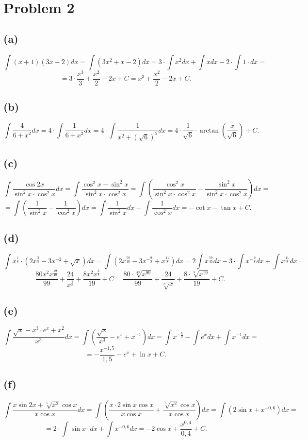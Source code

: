 \documentclass{article}
\begin{document}
\section*{Problem 2}
\subsection*{(a)}
$$\int(x + 1)(3x - 2)dx = \int(3x^2 + x - 2)dx = 3\cdot\int x^2dx + \int xdx - 2\cdot\int1\cdot dx = $$
$$ = 3\cdot\frac{x^3}{3} + \frac{x^2}{2} - 2x + C = x^3 + \frac{x^2}{2} - 2x + C.$$
\subsection*{(b)}
$$\int\frac{4}{6 + x^2}dx = 4\cdot\int\frac{1}{6 + x^2}dx = 4\cdot\int\frac{1}{x^2 + (\sqrt{6})^2}dx = 4\cdot\frac{1}{\sqrt{6}}\cdot\arctan{(\frac{x}{\sqrt{6}})} + C.$$
\subsection*{(c)}
$$\int\frac{\cos{2x}}{\sin^2{x}\cdot\cos^2{x}}dx = \int\frac{\cos^2{x} - \sin^2{x}}{\sin^2{x}\cdot\cos^2{x}} = \int\left(\frac{\cos^2{x}}{\sin^2{x}\cdot\cos^2{x}} - \frac{\sin^2{x}}{\sin^2{x}\cdot\cos^2{x}}\right)dx = $$
$$= \int\left(\frac{1}{\sin^2{x}} - \frac{1}{\cos^2{x}}\right)dx = \int\frac{1}{\sin^2{x}}dx - \int\frac{1}{\cos^2{x}}dx = - \cot{x} - \tan{x} + C.$$
\subsection*{(d)}
$$\int x^{\frac{7}{8}}\cdot(2x^{\frac{3}{5}} - 3x^{-2} + \sqrt{x})dx = \int(2x^{\frac{59}{40}} -3x^{-\frac{9}{8}} + x^{\frac{11}{8}})dx = 2\int x^{\frac{59}{40}}dx - 3\cdot\int x^{-\frac{9}{8}}dx + \int x^{\frac{11}{8}}dx = $$
$$= \frac{80x^2 x^{\frac{19}{40}}}{99} + \frac{24}{x^{\frac{1}{8}}} + \frac{8x^2x^{\frac{3}{8}}}{19} + C = \frac{80\cdot\sqrt[40]{x^{99}}}{99} + \frac{24}{\sqrt[8]{x}} + \frac{8\cdot\sqrt[8]{x^{19}}}{19} + C.$$
\subsection*{(e)}
$$\int\frac{\sqrt{x} - x^3\cdot e^x + x^2}{x^3}dx = \int\left(\frac{\sqrt{x}}{x^3} - e^x + x^{-1}\right)dx = \int x^{-\frac{5}{2}} - \int e^xdx + \int x^{-1}dx = $$
$$= -\frac{x^{-1,5}}{1,5} - e^x + \ln{x} + C.$$
\subsection*{(f)}
$$\int\frac{x\sin{2x} + \sqrt[5]{x^2}\cos{x}}{x\cos{x}}dx = \int\left(\frac{x\cdot2\sin{x}\cos{x}}{x\cos{x}} + \frac{\sqrt[5]{x^2}\cos{x}}{x\cos{x}}\right)dx = \int(2\sin{x} + x^{-0,6})dx = $$
$$ = 2\cdot\int\sin{x}\cdot dx + \int x^{-0,6}dx = -2\cos{x} + \frac{x^{0,4}}{0,4} + C.$$
\end{document}
